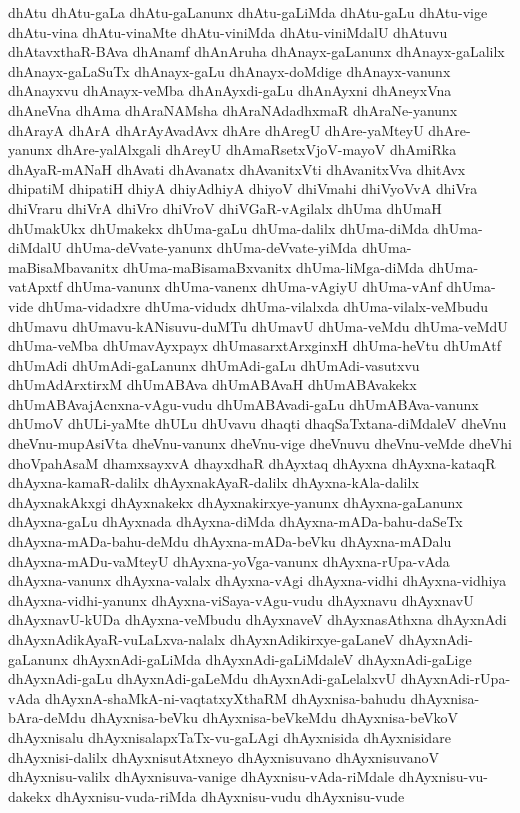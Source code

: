 {dhAtu
dhAtu-gaLa
dhAtu-gaLanunx
dhAtu-gaLiMda
dhAtu-gaLu
dhAtu-vige
dhAtu-vina
dhAtu-vinaMte
dhAtu-viniMda
dhAtu-viniMdalU
dhAtuvu
dhAtavxthaR-BAva
dhAnamf
dhAnAruha
dhAnayx-gaLanunx
dhAnayx-gaLalilx
dhAnayx-gaLaSuTx
dhAnayx-gaLu
dhAnayx-doMdige
dhAnayx-vanunx
dhAnayxvu
dhAnayx-veMba
dhAnAyxdi-gaLu
dhAnAyxni
dhAneyxVna
dhAneVna
dhAma
dhAraNAMsha
dhAraNAdadhxmaR
dhAraNe-yanunx
dhArayA
dhArA
dhArAyAvadAvx
dhAre
dhAregU
dhAre-yaMteyU
dhAre-yanunx
dhAre-yalAlxgali
dhAreyU
dhAmaRsetxVjoV-mayoV
dhAmiRka
dhAyaR-mANaH
dhAvati
dhAvanatx
dhAvanitxVti
dhAvanitxVva
dhitAvx
dhipatiM
dhipatiH
dhiyA
dhiyAdhiyA
dhiyoV
dhiVmahi
dhiVyoVvA
dhiVra
dhiVraru
dhiVrA
dhiVro
dhiVroV
dhiVGaR-vAgilalx
dhUma
dhUmaH
dhUmakUkx
dhUmakekx
dhUma-gaLu
dhUma-dalilx
dhUma-diMda
dhUma-diMdalU
dhUma-deVvate-yanunx
dhUma-deVvate-yiMda
dhUma-maBisaMbavanitx
dhUma-maBisamaBxvanitx
dhUma-liMga-diMda
dhUma-vatApxtf
dhUma-vanunx
dhUma-vanenx
dhUma-vAgiyU
dhUma-vAnf
dhUma-vide
dhUma-vidadxre
dhUma-vidudx
dhUma-vilalxda
dhUma-vilalx-veMbudu
dhUmavu
dhUmavu-kANisuvu-duMTu
dhUmavU
dhUma-veMdu
dhUma-veMdU
dhUma-veMba
dhUmavAyxpayx
dhUmasarxtArxginxH
dhUma-heVtu
dhUmAtf
dhUmAdi
dhUmAdi-gaLanunx
dhUmAdi-gaLu
dhUmAdi-vasutxvu
dhUmAdArxtirxM
dhUmABAva
dhUmABAvaH
dhUmABAvakekx
dhUmABAvajAcnxna-vAgu-vudu
dhUmABAvadi-gaLu
dhUmABAva-vanunx
dhUmoV
dhULi-yaMte
dhULu
dhUvavu
dhaqti
dhaqSaTxtana-diMdaleV
dheVnu
dheVnu-mupAsiVta
dheVnu-vanunx
dheVnu-vige
dheVnuvu
dheVnu-veMde
dheVhi
dhoVpahAsaM
dhamxsayxvA
dhayxdhaR
dhAyxtaq
dhAyxna
dhAyxna-kataqR
dhAyxna-kamaR-dalilx
dhAyxnakAyaR-dalilx
dhAyxna-kAla-dalilx
dhAyxnakAkxgi
dhAyxnakekx
dhAyxnakirxye-yanunx
dhAyxna-gaLanunx
dhAyxna-gaLu
dhAyxnada
dhAyxna-diMda
dhAyxna-mADa-bahu-daSeTx
dhAyxna-mADa-bahu-deMdu
dhAyxna-mADa-beVku
dhAyxna-mADalu
dhAyxna-mADu-vaMteyU
dhAyxna-yoVga-vanunx
dhAyxna-rUpa-vAda
dhAyxna-vanunx
dhAyxna-valalx
dhAyxna-vAgi
dhAyxna-vidhi
dhAyxna-vidhiya
dhAyxna-vidhi-yanunx
dhAyxna-viSaya-vAgu-vudu
dhAyxnavu
dhAyxnavU
dhAyxnavU-kUDa
dhAyxna-veMbudu
dhAyxnaveV
dhAyxnasAthxna
dhAyxnAdi
dhAyxnAdikAyaR-vuLaLxva-nalalx
dhAyxnAdikirxye-gaLaneV
dhAyxnAdi-gaLanunx
dhAyxnAdi-gaLiMda
dhAyxnAdi-gaLiMdaleV
dhAyxnAdi-gaLige
dhAyxnAdi-gaLu
dhAyxnAdi-gaLeMdu
dhAyxnAdi-gaLelalxvU
dhAyxnAdi-rUpa-vAda
dhAyxnA-shaMkA-ni-vaqtatxyXthaRM
dhAyxnisa-bahudu
dhAyxnisa-bAra-deMdu
dhAyxnisa-beVku
dhAyxnisa-beVkeMdu
dhAyxnisa-beVkoV
dhAyxnisalu
dhAyxnisalapxTaTx-vu-gaLAgi
dhAyxnisida
dhAyxnisidare
dhAyxnisi-dalilx
dhAyxnisutAtxneyo
dhAyxnisuvano
dhAyxnisuvanoV
dhAyxnisu-valilx
dhAyxnisuva-vanige
dhAyxnisu-vAda-riMdale
dhAyxnisu-vu-dakekx
dhAyxnisu-vuda-riMda
dhAyxnisu-vudu
dhAyxnisu-vude
}
